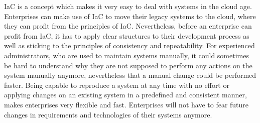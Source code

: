 IaC is a concept which makes it very easy to deal with systems in the cloud age. Enterprises can make use of IaC to move their legacy systems to the cloud, where they can profit from the principles of IaC. Nevertheless, before an enterprise can profit from IaC, it has to apply clear structures to their development process as well as sticking to the principles of consistency and repeatability. For experienced administrators, who are used to maintain systems manually, it could sometimes be hard to understand why they are not supposed to perform any actions on the system manually anymore, nevertheless that a manual change could be performed faster. Being capable to reproduce a system at any time with no effort or applying changes on an existing system in a predefined and consistent manner,  makes enterprises very flexible and fast. Enterprises will not have to fear future changes in requirements and technologies of their systems anymore.    



